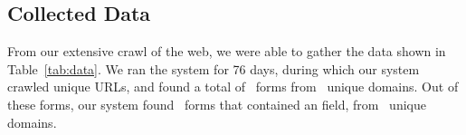 \subsection{Collected Data}


From our extensive crawl of the web, we were able to gather the data
shown in Table~\ref{tab:data}. We ran the system for 76 days, during which our system crawled \urls unique URLs,
and found a total of \forms\ forms from \uniqueforms\ unique domains. Out of these forms, our system
found \emailforms\ forms that contained an \email field, from \uniqueemailforms\ unique domains.



